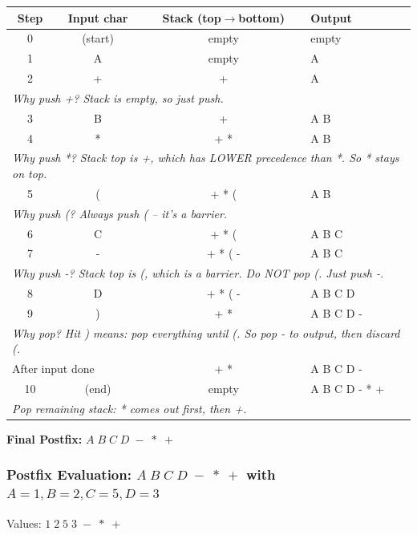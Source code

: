\documentclass[12pt,portrait]{article}
\begin{document}
\begin{center}
\begin{tabular}{c|c|c|l}
\toprule
\textbf{Step} & \textbf{Input char} & \textbf{Stack (top$\to$bottom)} & \textbf{Output} \\
\midrule
0 & (start) & empty & empty \\
1 & A & empty & A \\
2 & + & + & A \\
\multicolumn{4}{l}{\textit{Why push +? Stack is empty, so just push.}} \\
3 & B & + & A B \\
4 & * & + * & A B \\
\multicolumn{4}{l}{\textit{Why push *? Stack top is +, which has LOWER precedence than *. So * stays on top.}} \\
5 & ( & + * ( & A B \\
\multicolumn{4}{l}{\textit{Why push (? Always push ( -- it's a barrier.}} \\
6 & C & + * ( & A B C \\
7 & - & + * ( - & A B C \\
\multicolumn{4}{l}{\textit{Why push -? Stack top is (, which is a barrier. Do NOT pop (. Just push -.}} \\
8 & D & + * ( - & A B C D \\
9 & ) & + * & A B C D - \\
\multicolumn{4}{l}{\textit{Why pop? Hit ) means: pop everything until (. So pop - to output, then discard (.}} \\
\multicolumn{2}{l}{After input done} & + * & A B C D - \\
10 & (end) & empty & A B C D - * + \\
\multicolumn{4}{l}{\textit{Pop remaining stack: * comes out first, then +.}} \\
\bottomrule
\end{tabular}
\end{center}

\textbf{Final Postfix:} $A\;B\;C\;D\;-\;*\;+$

\subsubsection{Postfix Evaluation: $A\;B\;C\;D\;-\;*\;+$ with $A=1,B=2,C=5,D=3$}

Values: $1\;2\;5\;3\;-\;*\;+$
\end{document}
